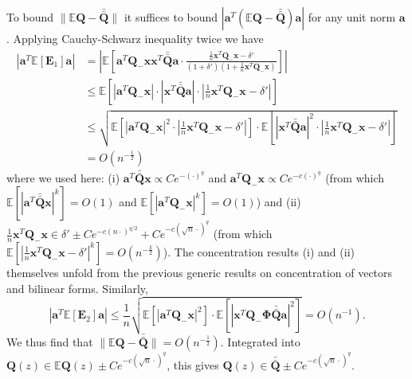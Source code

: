 \documentclass[12pt]{article}
\begin{document}
To bound $\|\mathbb{E}\mathbf{Q} - \bar{\bar{\mathbf{Q}}}\|$ it suffices to bound $|\mathbf{a}^T(\mathbb{E}\mathbf{Q} - \bar{\bar{\mathbf{Q}}})\mathbf{a}|$ for any unit norm $\mathbf{a}$. Applying Cauchy-Schwarz inequality twice we have
\begin{align*}
|\mathbf{a}^T\mathbb{E}[\mathbf{E}_1]\mathbf{a}| &= \left|\mathbb{E}\left[\mathbf{a}^T\mathbf{Q}_-\mathbf{x}\mathbf{x}^T\bar{\bar{\mathbf{Q}}}\mathbf{a} \cdot \frac{\frac{1}{n}\mathbf{x}^T\mathbf{Q}_-\mathbf{x} - \delta'}{(1 + \delta')\left(1 + \frac{1}{n}\mathbf{x}^T\mathbf{Q}_-\mathbf{x}\right)}\right]\right|\\
&\leq \mathbb{E}\left[|\mathbf{a}^T\mathbf{Q}_-\mathbf{x}| \cdot |\mathbf{x}^T\bar{\bar{\mathbf{Q}}}\mathbf{a}| \cdot \left|\frac{1}{n}\mathbf{x}^T\mathbf{Q}_-\mathbf{x} - \delta'\right|\right]\\
&\leq \sqrt{\mathbb{E}\left[|\mathbf{a}^T\mathbf{Q}_-\mathbf{x}|^2 \cdot \left|\frac{1}{n}\mathbf{x}^T\mathbf{Q}_-\mathbf{x} - \delta'\right|\right] \cdot \mathbb{E}\left[|\mathbf{x}^T\bar{\bar{\mathbf{Q}}}\mathbf{a}|^2 \cdot \left|\frac{1}{n}\mathbf{x}^T\mathbf{Q}_-\mathbf{x} - \delta'\right|\right]}\\
&= O(n^{-\frac{1}{2}})
\end{align*}
where we used here: (i) $\mathbf{a}^T\bar{\bar{\mathbf{Q}}}\mathbf{x} \propto Ce^{-(\cdot)^q}$ and $\mathbf{a}^T\mathbf{Q}_-\mathbf{x} \propto Ce^{-c(\cdot)^q}$ (from which $\mathbb{E}[|\mathbf{a}^T\bar{\bar{\mathbf{Q}}}\mathbf{x}|^k] = O(1)$ and $\mathbb{E}[|\mathbf{a}^T\mathbf{Q}_-\mathbf{x}|^k] = O(1)$) and (ii) $\frac{1}{n}\mathbf{x}^T\mathbf{Q}_-\mathbf{x} \in \delta' \pm Ce^{-c(n \cdot)^{q/2}} + Ce^{-c(\sqrt{n} \cdot)^q}$ (from which $\mathbb{E}[|\frac{1}{n}\mathbf{x}^T\mathbf{Q}_-\mathbf{x} - \delta'|^k] = O(n^{-\frac{k}{2}})$). The concentration results (i) and (ii) themselves unfold from the previous generic results on concentration of vectors and bilinear forms. Similarly,
\begin{equation*}
|\mathbf{a}^T\mathbb{E}[\mathbf{E}_2]\mathbf{a}| \leq \frac{1}{n}\sqrt{\mathbb{E}[|\mathbf{a}^T\mathbf{Q}_-\mathbf{x}|^2] \cdot \mathbb{E}[|\mathbf{x}^T\mathbf{Q}_-\boldsymbol{\Phi}\bar{\bar{\mathbf{Q}}}\mathbf{a}|^2]} = O(n^{-1}).
\end{equation*}
We thus find that $\|\mathbb{E}\mathbf{Q} - \bar{\bar{\mathbf{Q}}}\| = O(n^{-\frac{1}{2}})$. Integrated into $\mathbf{Q}(z) \in \mathbb{E}\mathbf{Q}(z) \pm Ce^{-c(\sqrt{n} \cdot)^q}$, this gives $\mathbf{Q}(z) \in \bar{\bar{\mathbf{Q}}} \pm Ce^{-c(\sqrt{n} \cdot)^q}$.
\end{document}
